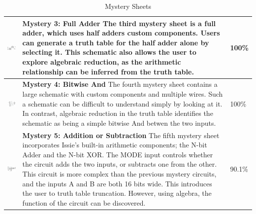 \begin{table}[h]
\begin{tabular}{|m{4.2cm}|m{7cm}|m{2cm}|}
         \includegraphics[width=4cm]{06.TestRes/m3.png}& \textbf{Mystery 3: Full Adder} The third mystery sheet is a full adder, which uses half adders custom components. Users can generate a truth table for the half adder alone by selecting it. This schematic also allows the user to explore algebraic reduction, as the arithmetic relationship can be inferred from the truth table. & 100\% \\
         \hline
         
         \includegraphics[width=4cm]{06.TestRes/m4.png}& \textbf{Mystery 4: Bitwise And} The fourth mystery sheet contains a large schematic with custom components and multiple wires. Such a schematic can be difficult to understand simply by looking at it. In contrast, algebraic reduction in the truth table identifies the schematic as being a simple bitwise And betwen the two inputs. & 100\% \\
         \hline
         
          \includegraphics[width=4cm]{06.TestRes/m5.png}& \textbf{Mystery 5: Addition or Subtraction} The fifth mystery sheet incorporates Issie's built-in arithmetic components; the N-bit Adder and the N-bit XOR. The MODE input controls whether the circuit adds the two inputs, or subtracts one from the other. This circuit is more complex than the previous mystery circuits, and the inputs A and B are both 16 bits wide. This introduces the user to truth table truncation. However, using algebra, the function of the circuit can be discovered. & 90.1\% \\
         \hline
    \end{tabular}
    \caption{Mystery Sheets}
    \label{tab:mystery}
\end{table}

